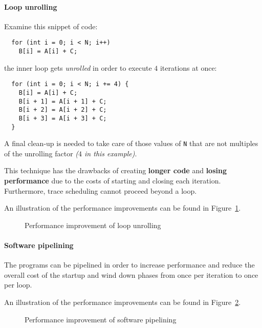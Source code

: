 \documentclass[english]{article}
\begin{document}
\paragraph{Loop unrolling}
\label{par:loop-unrolling}

Examine this snippet of code:

\begin{verbatim}
  for (int i = 0; i < N; i++)
    B[i] = A[i] + C;
\end{verbatim}

the inner loop gets \textit{unrolled} in order to execute \(4\) iterations at once:

\begin{verbatim}
  for (int i = 0; i < N; i += 4) {
    B[i] = A[i] + C;
    B[i + 1] = A[i + 1] + C;
    B[i + 2] = A[i + 2] + C;
    B[i + 3] = A[i + 3] + C;
  }
\end{verbatim}

A final clean-up is needed to take care of those values of \texttt{N} that are not multiples of the unrolling factor \textit{(\(4\) in this example)}.

This technique has the drawbacks of creating \textbf{longer code} and \textbf{losing performance} due to the costs of starting and closing each iteration.
Furthermore, trace scheduling cannot proceed beyond a loop.

\bigskip
An illustration of the performance improvements can be found in Figure~\ref{fig:performance-improvement-loop-unrolling}.

\begin{figure}[htbp]
  \bigskip
  \centering
  \caption{Performance improvement of loop unrolling}
  \label{fig:performance-improvement-loop-unrolling}
  \bigskip
\end{figure}

\paragraph{Software pipelining}
\label{par:software-pipelining}

The programs can be pipelined in order to increase performance and reduce the overall cost of the startup and wind down phases from once per iteration to once per loop.

\bigskip
An illustration of the performance improvements can be found in Figure~\ref{fig:performance-improvement-software-pipelining}.

\begin{figure}[htbp]
  \bigskip
  \centering
  \caption{Performance improvement of software pipelining}
  \label{fig:performance-improvement-software-pipelining}
  \bigskip
\end{figure}
\end{document}
